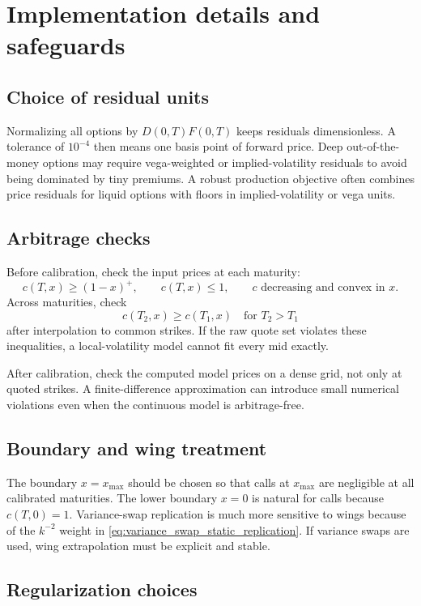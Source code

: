 \documentclass[11pt]{article}
\newcommand{\1}{\mathbf{1}}
\newcommand{\xmax}{x_{\max}}
\begin{document}
\section{Implementation details and safeguards}

\subsection{Choice of residual units}

Normalizing all options by $D(0,T)F(0,T)$ keeps residuals dimensionless. A tolerance of
$10^{-4}$ then means one basis point of forward price. Deep out-of-the-money options may
require vega-weighted or implied-volatility residuals to avoid being dominated by tiny
premiums. A robust production objective often combines price residuals for liquid options
with floors in implied-volatility or vega units.

\subsection{Arbitrage checks}

Before calibration, check the input prices at each maturity:
\[
  c(T,x)\ge(1-x)^+,\qquad
  c(T,x)\le1,\qquad
  c \text{ decreasing and convex in }x.
\]
Across maturities, check
\[
  c(T_2,x)\ge c(T_1,x)\quad\text{for }T_2>T_1
\]
after interpolation to common strikes. If the raw quote set violates these inequalities,
a local-volatility model cannot fit every mid exactly.

After calibration, check the computed model prices on a dense grid, not only at quoted
strikes. A finite-difference approximation can introduce small numerical violations even
when the continuous model is arbitrage-free.

\subsection{Boundary and wing treatment}

The boundary $x=\xmax$ should be chosen so that calls at $\xmax$ are negligible at all
calibrated maturities. The lower boundary $x=0$ is natural for calls because
$c(T,0)=1$. Variance-swap replication is much more sensitive to wings because of the
$k^{-2}$ weight in \eqref{eq:variance_swap_static_replication}. If variance swaps are
used, wing extrapolation must be explicit and stable.

\subsection{Regularization choices}
\end{document}
